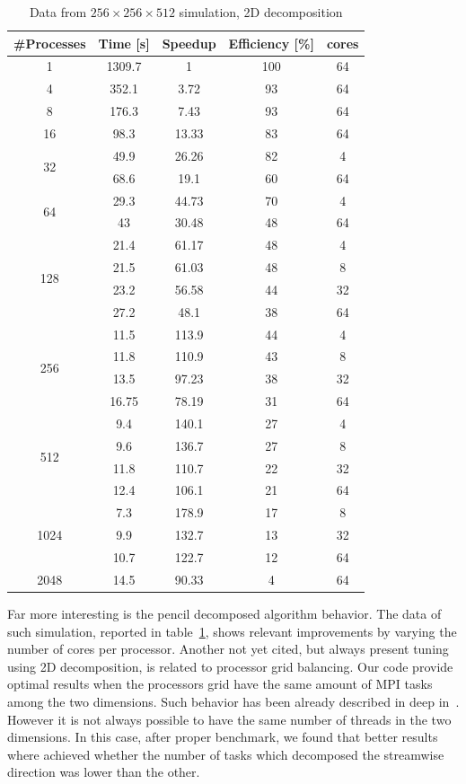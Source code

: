 \begin{table}
\caption{Data from $256\times 256\times 512$  simulation, 2D decomposition}
\begin{center}
\begin{tabular}{c c c c c}
\toprule
\textbf{\#Processes} & \textbf{Time [s]} & \textbf{Speedup} & \textbf{Efficiency [\%]} & \textbf{cores}\\
\midrule
1 & 1309.7 & 1 & 100 & 64 \\
4 & 352.1 & 3.72 & 93 & 64\\
8 & 176.3 & 7.43 & 93 & 64\\
16 & 98.3 & 13.33 & 83 & 64\\
\hline
\multirow{2}{*}{32} & 49.9 & 26.26 & 82 & 4\\
& 68.6 & 19.1 & 60 & 64\\
\hline
\multirow{2}{*}{64} & 29.3 & 44.73 & 70 & 4\\ 
 & 43 & 30.48 & 48 & 64\\
\hline
\multirow{4}{*}{128} & 21.4 & 61.17 &  48 & 4\\
& 21.5 & 61.03 & 48 & 8\\
& 23.2 & 56.58 & 44 & 32\\
& 27.2 & 48.1 & 38 & 64\\
\hline
\multirow{4}{*}{256} & 11.5 & 113.9 & 44 & 4\\
& 11.8 & 110.9 & 43 & 8\\
&13.5 & 97.23 & 38 & 32\\
&16.75 & 78.19 & 31 & 64\\
\hline
\multirow{4}{*}{512} & 9.4 & 140.1 & 27 & 4\\
&9.6 & 136.7 & 27 & 8\\
&11.8 & 110.7 & 22 & 32\\
&12.4 & 106.1 & 21 & 64\\
\hline
\multirow{3}{*}{1024} & 7.3 & 178.9 & 17 & 8\\
&9.9 & 132.7 & 13 & 32\\
&10.7 & 122.7 & 12 & 64\\
\hline
2048 & 14.5 & 90.33 & 4 & 64\\
\bottomrule
\end{tabular}
\end{center}
\label{128:data:2}
\end{table}

\par
Far more interesting is the pencil decomposed algorithm behavior. The data of such simulation, reported in table~\ref{128:data:2}, shows relevant improvements by varying the number of cores per processor. Another not yet cited, but always present tuning using 2D decomposition, is related to processor grid balancing. Our code provide optimal results when the processors grid have the same amount of MPI tasks among the two dimensions. Such behavior has been already described in deep in~\cite[39]{tesi:brach}. However it is not always possible to have the same number of threads in the two dimensions. In this case, after proper benchmark, we found that better results where achieved whether the number of tasks which decomposed the streamwise direction was lower than the other.
\par

